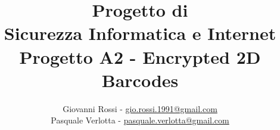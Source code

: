 \documentclass[12pt, a4paper, openany, oneside, titlepage]{book}	%
\begin{document}
	\begin{titlepage}
		
		\title{Progetto di \vspace{2mm} \\ Sicurezza Informatica e Internet \\ \vspace{2 mm} {\large \bf{Progetto A2 - Encrypted 2D Barcodes}}}
		\author{Giovanni Rossi - \url{gio.rossi.1991@gmail.com}\\Pasquale Verlotta - \url{pasquale.verlotta@gmail.com} }
		\date{}%

	\end{titlepage}

	\maketitle

	\frontmatter

	\small




	\tableofcontents 
	\label{Indice}
	
	\listoffigures


	\normalsize

	\mainmatter

	
	
	
	

\end{document}
